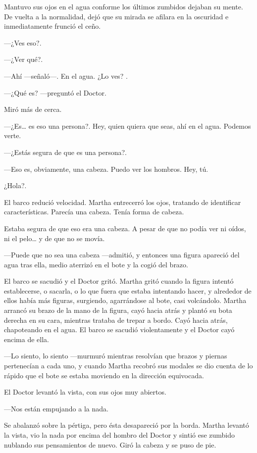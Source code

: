 Mantuvo sus ojos en el agua conforme los últimos zumbidos dejaban su mente. De vuelta a la normalidad, dejó que su mirada se afilara en la oscuridad e inmediatamente frunció el ceño.

---¿Ves eso?.

---¿Ver qué?.

---Ahí ---señaló---. En el agua. ¿Lo ves? .

---¿Qué es? ---preguntó el Doctor.

Miró más de cerca.

---¿Es\ldots{} es eso una persona?. Hey, quien quiera que seas, ahí en el agua. Podemos verte.

---¿Estás segura de que es una persona?.

---Eso es, obviamente, una cabeza. Puedo ver los hombros. Hey, tú.

¿Hola?.

El barco redució velocidad. Martha entrecerró los ojos, tratando de identificar características. Parecía una cabeza. Tenía forma de cabeza.

Estaba segura de que eso era una cabeza. A pesar de que no podía ver ni oídos, ni el pelo\ldots{} y de que no se movía.

---Puede que no sea una cabeza ---admitió, y entonces una figura apareció del agua tras ella, medio aterrizó en el bote y la cogió del brazo.

El barco se sacudió y el Doctor gritó. Martha gritó cuando la figura intentó establecerse, o sacarla, o lo que fuera que estaba intentando hacer, y alrededor de ellos había más figuras, surgiendo, agarrándose al bote, casi volcándolo. Martha arrancó su brazo de la mano de la figura, cayó hacia atrás y plantó su bota derecha en su cara, mientras trataba de trepar a bordo. Cayó hacia atrás, chapoteando en el agua. El barco se sacudió violentamente y el Doctor cayó encima de ella.

---Lo siento, lo siento ---murmuró mientras resolvían que brazos y piernas pertenecían a cada uno, y cuando Martha recobró sus modales se dio cuenta de lo rápido que el bote se estaba moviendo en la dirección equivocada.

El Doctor levantó la vista, con sus ojos muy abiertos.

---Nos están empujando a la nada.

Se abalanzó sobre la pértiga, pero ésta desapareció por la borda. Martha levantó la vista, vio la nada por encima del hombro del Doctor y sintió ese zumbido nublando sus pensamientos de nuevo. Giró la cabeza y se puso de pie.

